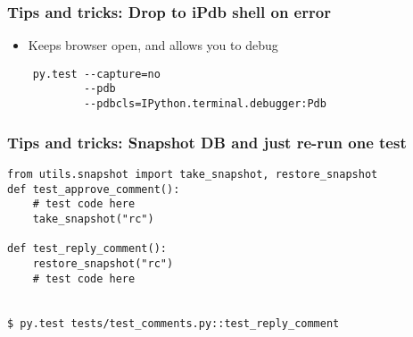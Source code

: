 \documentclass{beamer}
\begin{document}
\begin{frame}[fragile]
  \frametitle{Tips and tricks: Drop to iPdb shell on error}
  \begin{itemize}
  \item Keeps browser open, and allows you to debug
  \end{itemize}
  \begin{verbatim}
    py.test --capture=no
            --pdb
            --pdbcls=IPython.terminal.debugger:Pdb
\end{verbatim}
\end{frame}

\begin{frame}[fragile]
  \frametitle{Tips and tricks: Snapshot DB and just re-run one test}
  \begin{itemize}
  \end{itemize}
  \begin{verbatim}
from utils.snapshot import take_snapshot, restore_snapshot
def test_approve_comment():
    # test code here
    take_snapshot("rc")
    
def test_reply_comment():
    restore_snapshot("rc")
    # test code here


$ py.test tests/test_comments.py::test_reply_comment
    
\end{verbatim}
\end{frame}
\end{document}
